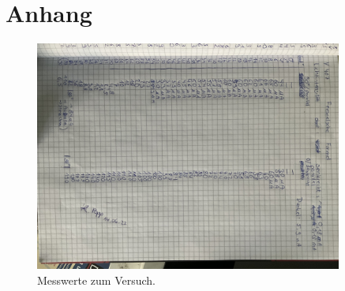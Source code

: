 \section{Anhang}\label{sec:Anhang}
\begin{figure}[H]
   \centering
    \includegraphics[angle=-90, width=0.9\textwidth]{Abbildung/KladdeS1.jpeg}
   \caption{Messwerte zum Versuch.}
\end{figure}
\pagebreak